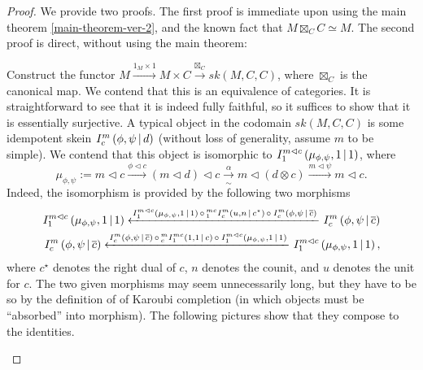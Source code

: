 \begin{proof}
  We provide two proofs. The first proof is immediate upon using the main theorem
  \ref{main-theorem-ver-2},
  and the known fact that $M \boxtimes_{C} C
  \simeq M$. The second proof is direct, without using the main theorem:

  Construct the functor $M \xrightarrow{1_{M} \times 1} M \times C
  \xrightarrow{\boxtimes_{C}} sk(M,C,C)$, where $\boxtimes_{C}$ is the
  canonical map.
  We contend that this is an
  equivalence of categories. It is straightforward to see that it is indeed
  fully faithful, so it suffices to show that it is essentially surjective. A
  typical object in the codomain $sk(M,C,C)$ is some idempotent skein
  ${}^{}_{} I^{m}_{c} \left( \phi, \psi \,\middle|\, d \right)$ (without loss of generality, assume $m$ to be
  simple). We contend that this object is isomorphic to ${}^{}_{} I^{m \lhd
    c}_{1} \left( \mu_{\phi, \psi}, 1 \,\middle|\, 1 \right)$, where
  \[
    \mu_{\phi,\psi} :=
    m \lhd c
    \xrightarrow{\phi \lhd c}
    (m \lhd d) \lhd c
    \xrightarrow[\sim]{\alpha}
    m \lhd (d \otimes c)
    \xrightarrow{m \lhd \psi}
    m \lhd c.
  \]
  Indeed, the isomorphism is provided by the following two morphisms
  \begin{align*}
    {}^{}_{} I^{m \lhd c}_{1} \left( \mu_{\phi, \psi}, 1 \,\middle|\, 1 \right)
    \xleftarrow{
    {}^{}_{} I^{m \lhd c}_{1} \left( \mu_{\phi, \psi}, 1 \,\middle|\, 1 \right)
    \, \circ \,
    {}^{mc}_{1} I^{m}_{c} \left( u, n \,\middle|\, c^{\star} \right)
    \, \circ \,
    {}^{}_{} I^{m}_{c} \left( \phi, \psi \,\middle|\, \overline{c} \right)}
    {}^{}_{} I^{m}_{c} \left( \phi, \psi \,\middle|\, \overline{c} \right)
    \\
    {}^{}_{} I^{m}_{c} \left( \phi, \psi \,\middle|\, \overline{c} \right)
    \xleftarrow{
    {}^{}_{} I^{m}_{c} \left( \phi, \psi \,\middle|\, \overline{c} \right)
    \, \circ \,
    {}^{m}_{c} I^{mc}_{1} \left( 1, 1 \,\middle|\, c \right)
    \, \circ \,
    {}^{}_{} I^{m \lhd c}_{1} \left( \mu_{\phi, \psi}, 1 \,\middle|\, 1 \right)
    }
    {}^{}_{} I^{m \lhd c}_{1} \left( \mu_{\phi, \psi}, 1 \,\middle|\, 1 \right),
  \end{align*}
  where $c^{\star}$ denotes the right dual of $c$, $n$ denotes the counit, and
  $u$ denotes the unit for $c$. The two given morphisms may seem unnecessarily
  long, but they have to be so by the definition of of Karoubi completion (in
  which objects must be ``absorbed'' into morphism). The following pictures
  show that they compose to the identities.

  \begin{center}
    
  \end{center}
\end{proof}

